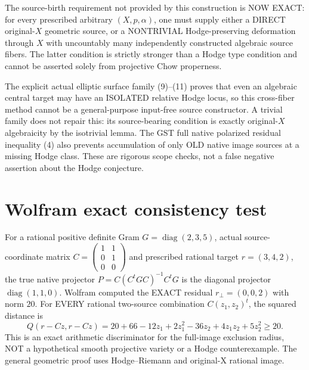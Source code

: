 \documentclass[11pt]{article}
\begin{document}
The source-birth
requirement not
provided by this
construction is
NOW EXACT:
for every
prescribed
arbitrary
\((X,p,\alpha)\),
one must
supply either
a DIRECT
original-\(X\)
geometric source,
or a
NONTRIVIAL
Hodge-preserving
deformation
through \(X\)
with uncountably
many
independently
constructed
algebraic
source fibers.
The latter
condition is
strictly stronger
than a
Hodge type
condition
and cannot
be asserted
solely from
projective
Chow properness.

The explicit
actual
elliptic
surface
family
(9)--(11)
proves that
even an
algebraic
central
target may
have an
ISOLATED
relative
Hodge locus,
so this
cross-fiber
method cannot
be a
general-purpose
input-free
source
constructor.
A trivial
family does
not repair
this:
its
source-bearing
condition
is exactly
original-\(X\)
algebraicity
by the
isotrivial
lemma.
The GST
full native
polarized
residual
inequality (4)
also prevents
accumulation
of only
OLD native
image
sources at
a missing
Hodge class.
These are
rigorous
scope checks,
not a
false
negative
assertion
about the
Hodge
conjecture.

\section{Wolfram exact consistency test}
For a rational positive
definite Gram
\(G=\operatorname{diag}(2,3,5)\),
actual source-coordinate matrix
\(
C=\left(\begin{smallmatrix}1&1\\0&1\\0&0
\end{smallmatrix}\right)
\)
and prescribed rational target
\(r=(3,4,2)\), the true
native projector
\(
P=C(C^tGC)^{-1}C^tG
\)
is the diagonal projector
\(\operatorname{diag}(1,1,0)\).
Wolfram computed the EXACT
residual \(r_\perp=(0,0,2)\)
with norm \(20\).
For EVERY rational
two-source combination
\(C(z_1,z_2)^t\),
the squared distance is
\[
 Q(r-Cz,r-Cz)=20+
 66-12z_1+2z_1^2-36z_2+
               4z_1z_2+5z_2^2
 \ge20 .
\]
This is an exact arithmetic
discriminator for the full-image
exclusion radius, NOT a
hypothetical smooth projective
variety or a Hodge counterexample.
The general geometric proof
uses Hodge--Riemann and
original-X rational image.
\end{document}
